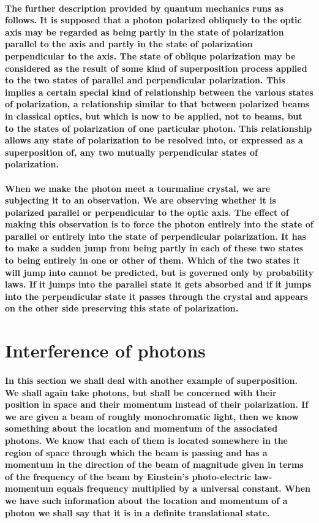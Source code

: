 \documentclass[10pt, kindle, oneside]{kindle}
\begin{document}
\paragraph{The further description provided by quantum mechanics runs as follows. It is supposed that a photon polarized obliquely to the optic axis may be regarded as being partly in the state of polarization parallel to the axis and partly in the state of polarization perpendicular to the axis. The state of oblique polarization may be considered as the result of some kind of superposition process applied to the two states of parallel and perpendicular polarization. This implies a certain special kind of relationship between the various states of polarization, a relationship similar to that between polarized beams in classical optics, but which is now to be applied, not to beams, but to the states of polarization of one particular photon. This relationship allows any state of polarization to be resolved into, or expressed as a superposition of, any two mutually perpendicular states of polarization.}
\paragraph{When we make the photon meet a tourmaline crystal, we are subjecting it to an observation. We are observing whether it is polarized parallel or perpendicular to the optic axis. The effect of making this observation is to force the photon entirely into the state of parallel or entirely into the state of perpendicular polarization. It has to make a sudden jump from being partly in each of these two states to being entirely in one or other of them. Which of the two states it will jump into cannot be predicted, but is governed only by probability laws. If it jumps into the parallel state it gets absorbed and if it jumps into the perpendicular state it passes through the crystal and appears on the other side preserving this state of polarization.}
\section{Interference of photons}
\paragraph{In this section we shall deal with another example of superposition. We shall again take photons, but shall be concerned with their position in space and their momentum instead of their polarization. If we are given a beam of roughly monochromatic light, then we know something about the location and momentum of the associated photons. We know that each of them is located somewhere in the region of space through which the beam is passing and has a momentum in the direction of the beam of magnitude given in terms of the frequency of the beam by Einstein's photo-electric law-momentum equals frequency multiplied by a universal constant. When we have such information about the location and momentum of a photon we shall say that it is in a definite translational state.}
\end{document}
